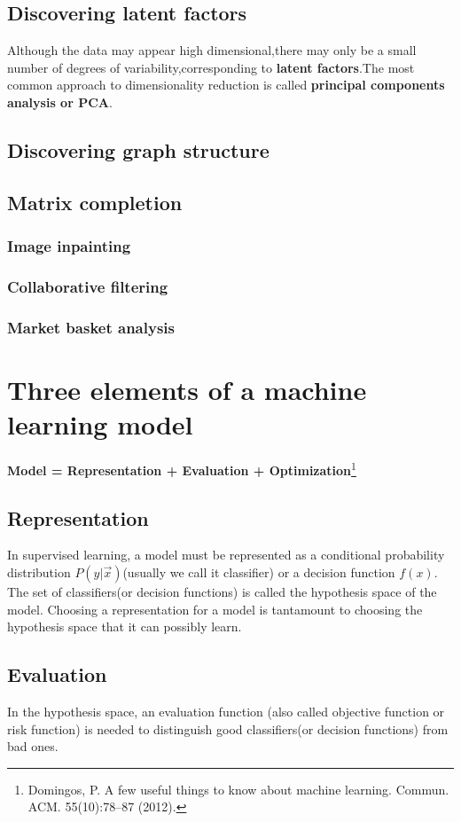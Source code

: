 \subsection{Discovering latent factors}
Although the data may appear high dimensional,there may only be a small number of degrees of variability,corresponding to \textbf{latent factors}.The most common approach to dimensionality reduction is called \textbf{principal components analysis or PCA}.
\subsection{Discovering graph structure}
\subsection{Matrix completion}
\subsubsection{Image inpainting}
\subsubsection{Collaborative filtering}
\subsubsection{Market basket analysis}

\section{Three elements of a machine learning model}

\textbf{Model = Representation + Evaluation + Optimization}\footnote{Domingos, P. A few useful things to know about machine learning. Commun. ACM. 55(10):78–87 (2012).}


\subsection{Representation}
In supervised learning, a model must be represented as a conditional probability distribution $P(y|\vec{x})$(usually we call it classifier) or a decision function $f(x)$. The set of classifiers(or decision functions) is called the hypothesis space of the model. Choosing a representation for a model is tantamount to choosing the hypothesis space that it can possibly learn. 


\subsection{Evaluation}
In the hypothesis space, an evaluation function (also called objective function or risk function) is needed to distinguish good classifiers(or decision functions) from bad ones.


